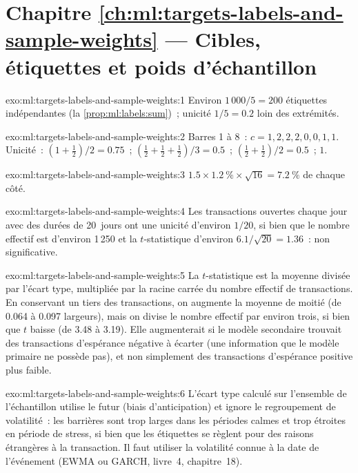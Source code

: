 \section*{Chapitre \ref{ch:ml:targets-labels-and-sample-weights} --- Cibles, étiquettes et poids d'échantillon}

\begin{solution}{exo:ml:targets-labels-and-sample-weights:1}
Environ $1\,000/5 = 200$ étiquettes indépendantes (la \cref{prop:ml:labels:sum})~; unicité $1/5 = 0.2$ loin des extrémités.
\end{solution}

\begin{solution}{exo:ml:targets-labels-and-sample-weights:2}
Barres 1 à 8~: $c = 1, 2, 2, 2, 0, 0, 1, 1$. Unicité~: $(1 + \tfrac12)/2 = 0.75$~; $(\tfrac12 + \tfrac12 + \tfrac12)/3 =
0.5$~; $(\tfrac12 + \tfrac12)/2 = 0.5$~; $1$.
\end{solution}

\begin{solution}{exo:ml:targets-labels-and-sample-weights:3}
$1.5\times1.2~\%\times\sqrt{16} = 7.2~\%$ de chaque côté.
\end{solution}

\begin{solution}{exo:ml:targets-labels-and-sample-weights:4}
Les transactions ouvertes chaque jour avec des durées de 20~jours ont une unicité d'environ $1/20$, si bien que le nombre effectif est d'environ 1\,250 et la
$t$-statistique d'environ $6.1/\sqrt{20} = 1.36$~: non significative.
\end{solution}

\begin{solution}{exo:ml:targets-labels-and-sample-weights:5}
La $t$-statistique est la moyenne divisée par l'écart type, multipliée par la racine carrée du nombre effectif de transactions.
En conservant un tiers des transactions, on augmente la moyenne de moitié (de 0.064 à 0.097 largeurs), mais on divise le nombre effectif par environ
trois, si bien que $t$ baisse (de 3.48 à 3.19). Elle augmenterait si le modèle secondaire trouvait des transactions d'espérance négative à écarter
(une information que le modèle primaire ne possède pas), et non simplement des transactions d'espérance positive plus faible.
\end{solution}

\begin{solution}{exo:ml:targets-labels-and-sample-weights:6}
L'écart type calculé sur l'ensemble de l'échantillon utilise le futur (biais d'anticipation) et ignore le regroupement de volatilité~: les barrières sont trop
larges dans les périodes calmes et trop étroites en période de stress, si bien que les étiquettes se règlent pour des raisons étrangères à la transaction. Il faut utiliser la volatilité
connue à la date de l'événement (EWMA ou GARCH, livre~4, chapitre~18).
\end{solution}

